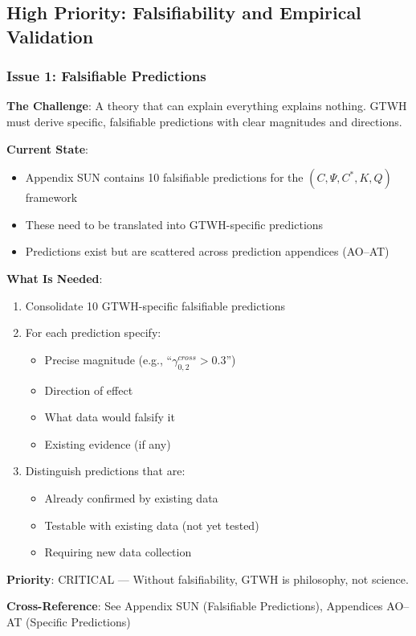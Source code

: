 \subsection{High Priority: Falsifiability and Empirical Validation}

\subsubsection{Issue 1: Falsifiable Predictions}

\begin{tcolorbox}[colback=red!5!white, colframe=red!75!black, title=Status: Partially Addressed]
\textbf{The Challenge}: A theory that can explain everything explains nothing. 
GTWH must derive specific, falsifiable predictions with clear magnitudes and 
directions.

\textbf{Current State}: 
\begin{itemize}[nosep]
\item Appendix SUN contains 10 falsifiable predictions for the $(C, \Psi, C^*, K, Q)$ framework
\item These need to be translated into GTWH-specific predictions
\item Predictions exist but are scattered across prediction appendices (AO--AT)
\end{itemize}

\textbf{What Is Needed}:
\begin{enumerate}
\item Consolidate 10 GTWH-specific falsifiable predictions
\item For each prediction specify:
    \begin{itemize}[nosep]
    \item Precise magnitude (e.g., ``$\gamma^{cross}_{0,2} > 0.3$'')
    \item Direction of effect
    \item What data would falsify it
    \item Existing evidence (if any)
    \end{itemize}
\item Distinguish predictions that are:
    \begin{itemize}[nosep]
    \item Already confirmed by existing data
    \item Testable with existing data (not yet tested)
    \item Requiring new data collection
    \end{itemize}
\end{enumerate}

\textbf{Priority}: \colorbox{red!20}{CRITICAL} --- Without falsifiability, GTWH is philosophy, not science.

\textbf{Cross-Reference}: See Appendix SUN (Falsifiable Predictions), Appendices AO--AT (Specific Predictions)
\end{tcolorbox}

